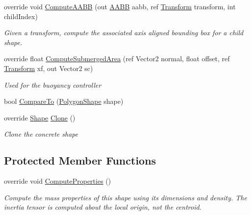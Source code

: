\begin{DoxyCompactItemize}
override void \hyperlink{class_farseer_physics_1_1_collision_1_1_shapes_1_1_polygon_shape_a537990602fe017315491b1161476e2db}{Compute\+A\+A\+B\+B} (out \hyperlink{struct_farseer_physics_1_1_collision_1_1_a_a_b_b}{A\+A\+B\+B} aabb, ref \hyperlink{struct_farseer_physics_1_1_common_1_1_transform}{Transform} transform, int child\+Index)
\begin{DoxyCompactList}\small\item\em Given a transform, compute the associated axis aligned bounding box for a child shape. \end{DoxyCompactList}\item 
override float \hyperlink{class_farseer_physics_1_1_collision_1_1_shapes_1_1_polygon_shape_ab58f0cef9a7a72ef9ed96e6a8bd8a86e}{Compute\+Submerged\+Area} (ref Vector2 normal, float offset, ref \hyperlink{struct_farseer_physics_1_1_common_1_1_transform}{Transform} xf, out Vector2 sc)
\begin{DoxyCompactList}\small\item\em Used for the buoyancy controller \end{DoxyCompactList}\item 
bool \hyperlink{class_farseer_physics_1_1_collision_1_1_shapes_1_1_polygon_shape_a0f4c6241b20e92df8a3fde62a07488f4}{Compare\+To} (\hyperlink{class_farseer_physics_1_1_collision_1_1_shapes_1_1_polygon_shape}{Polygon\+Shape} shape)
\item 
override \hyperlink{class_farseer_physics_1_1_collision_1_1_shapes_1_1_shape}{Shape} \hyperlink{class_farseer_physics_1_1_collision_1_1_shapes_1_1_polygon_shape_a86171eae83195591691749aafb617c24}{Clone} ()
\begin{DoxyCompactList}\small\item\em Clone the concrete shape \end{DoxyCompactList}\end{DoxyCompactItemize}
\subsection*{Protected Member Functions}
\begin{DoxyCompactItemize}
\item 
override void \hyperlink{class_farseer_physics_1_1_collision_1_1_shapes_1_1_polygon_shape_a68808da62dc2ce71047d891eb88d98f0}{Compute\+Properties} ()
\begin{DoxyCompactList}\small\item\em Compute the mass properties of this shape using its dimensions and density. The inertia tensor is computed about the local origin, not the centroid. \end{DoxyCompactList}\end{DoxyCompactItemize}
